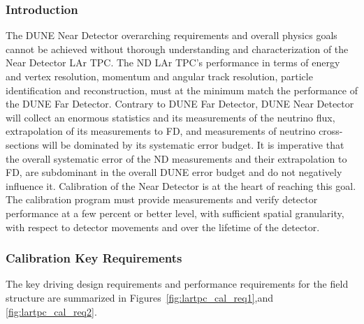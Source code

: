 \subsubsection{Introduction} 
The DUNE Near Detector overarching requirements and overall physics goals cannot be achieved without thorough understanding and characterization of the Near Detector LAr TPC. The ND LAr TPC’s performance in terms of energy and vertex resolution, momentum and angular track resolution, particle identification and reconstruction, must at the minimum match the performance of the DUNE Far Detector. Contrary to DUNE Far Detector, DUNE Near Detector will collect an enormous statistics and its measurements of the neutrino flux, extrapolation of its measurements to FD, and measurements of neutrino cross-sections will be dominated by its systematic error budget. It is imperative that the overall systematic error of the ND measurements and their extrapolation to FD, are subdominant in the overall DUNE error budget and do not negatively influence it. Calibration of the Near Detector is at the heart of reaching  this goal. The calibration program must provide measurements and verify detector performance at a few percent or better level, with sufficient spatial granularity, with respect to detector movements and over the lifetime of the detector. 
\subsubsection{Calibration Key Requirements}
\label{sec:lartpc-cal-req}

The key driving design requirements and performance requirements for the field structure are summarized in Figures~\ref{fig:lartpc_cal_req1},and \ref{fig:lartpc_cal_req2}. 

